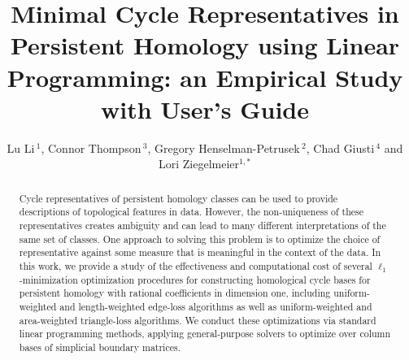 \documentclass[utf8]{formatting_stuff/frontiersFPHY}
\theoremstyle{plain}
\theoremstyle{definition}
\def\firstAuthorLast{Li {et~al.}}
\def\Authors{Lu Li\,$^{1}$, Connor Thompson\,$^{3}$, Gregory Henselman-Petrusek\,$^{2}$, Chad Giusti\,$^{4}$ and Lori Ziegelmeier$^{1,*}$}
\begin{document}
 \onecolumn
{}
\title[Running Title]{Minimal Cycle Representatives in Persistent Homology using Linear Programming: an Empirical Study with User's Guide} 
\author[\firstAuthorLast ]{\Authors} %
\address{} %
\correspondance{} %
\extraAuth{}%


\maketitle

\begin{abstract}


 

Cycle representatives of persistent homology classes can be used to provide descriptions of topological features in data. However, the non-uniqueness of these representatives creates ambiguity and can lead to many different interpretations of the same set of classes. One approach to solving this problem is to optimize the choice of representative against some measure that is meaningful in the context of the data. In this work, we provide a study of the effectiveness and computational cost of several $\ell_1$-minimization optimization procedures for constructing homological cycle bases for persistent homology with rational coefficients in dimension one, including uniform-weighted and length-weighted edge-loss algorithms as well as uniform-weighted and area-weighted triangle-loss algorithms. We conduct these optimizations via standard linear programming methods, applying general-purpose solvers to optimize over column bases of simplicial boundary matrices. 


\end{abstract}
\end{document}
